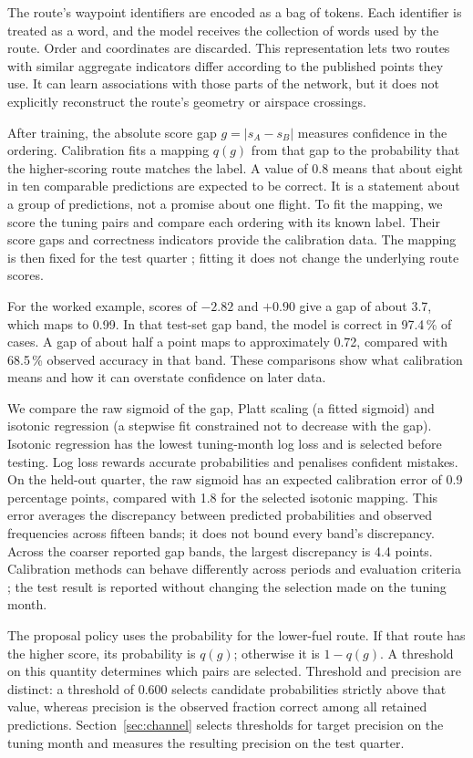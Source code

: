 \documentclass[preprint,authoryear,12pt]{elsarticle}
\begin{document}
The route's waypoint identifiers are encoded as a bag of tokens.
Each identifier is treated as a word, and the model receives the
collection of words used by the route. Order and coordinates are
discarded. This representation lets two routes with similar aggregate
indicators differ according to the published points they use. It can
learn associations with those parts of the network, but it does not
explicitly reconstruct the route's geometry or airspace crossings.

After training, the absolute score gap $g=|s_A-s_B|$ measures confidence
in the ordering. Calibration fits a mapping $q(g)$ from that gap to the
probability that the higher-scoring route matches the label. A value
of 0.8 means that about eight in ten comparable predictions are expected
to be correct. It is a statement about a group of predictions, not a
promise about one flight. To fit the mapping, we score the tuning pairs and compare each ordering
with its known label. Their score gaps and correctness indicators provide
the calibration data. The mapping is then fixed for the test quarter
\citep{zadrozny2002}; fitting it does not change the underlying route
scores.

For the worked example, scores of $-2.82$ and $+0.90$ give a gap of
about 3.7, which maps to 0.99. In that test-set gap band, the model is
correct in 97.4\,\% of cases. A gap of about half a point maps to
approximately 0.72, compared with 68.5\,\% observed accuracy in that
band. These comparisons show what calibration means and how it can
overstate confidence on later data.

We compare the raw sigmoid of the gap, Platt scaling (a fitted sigmoid)
and isotonic regression (a stepwise fit constrained not to decrease
with the gap). Isotonic regression
has the lowest tuning-month log loss and is selected before testing.
Log loss rewards accurate probabilities and penalises confident mistakes.
On the held-out quarter, the raw sigmoid has an expected calibration
error of 0.9 percentage points, compared with 1.8 for the selected
isotonic mapping. This error averages the discrepancy between predicted
probabilities and observed frequencies across fifteen bands; it does
not bound every band's discrepancy. Across the coarser reported gap
bands, the largest discrepancy is 4.4 points. Calibration methods can
behave differently across periods and evaluation criteria
\citep{guo2017}; the test result is reported without changing the
selection made on the tuning month.

The proposal policy uses the probability for the lower-fuel route.
If that route has the higher score, its probability is $q(g)$;
otherwise it is $1-q(g)$. A threshold on this quantity determines
which pairs are selected. Threshold and precision are distinct: a
threshold of 0.600 selects candidate probabilities strictly above that value,
whereas precision is the observed fraction correct among all retained
predictions. Section~\ref{sec:channel} selects thresholds for target
precision on the tuning month and measures the resulting precision
on the test quarter.
\end{document}
